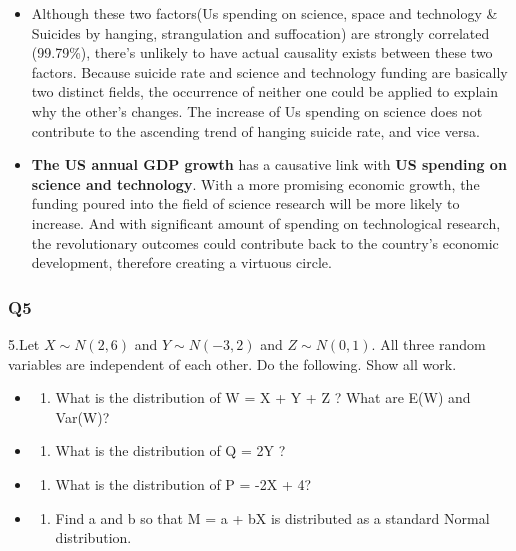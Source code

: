 \documentclass[11pt]{article}
\providecommand{\tightlist}{%
      \setlength{\itemsep}{0pt}\setlength{\parskip}{0pt}}
\begin{document}
\begin{itemize}
\item
  Although these two factors(Us spending on science, space and
  technology \& Suicides by hanging, strangulation and suffocation) are
  strongly correlated (99.79\%), there's unlikely to have actual
  causality exists between these two factors. Because suicide rate and
  science and technology funding are basically two distinct fields, the
  occurrence of neither one could be applied to explain why the other's
  changes. The increase of Us spending on science does not contribute to
  the ascending trend of hanging suicide rate, and vice versa.
\item
  \textbf{The US annual GDP growth} has a causative link with \textbf{US
  spending on science and technology}. With a more promising economic
  growth, the funding poured into the field of science research will be
  more likely to increase. And with significant amount of spending on
  technological research, the revolutionary outcomes could contribute
  back to the country's economic development, therefore creating a
  virtuous circle.
\end{itemize}

    \subsubsection*{Q5}\label{q5}

    5.Let \(X \sim N(2, 6)\) and \(Y \sim N(-3, 2)\) and \(Z \sim N(0, 1)\).
All three random variables are independent of each other. Do the
following. Show all work.

\begin{itemize}
\item
  \begin{enumerate}
  \def\labelenumi{(\alph{enumi})}
  \tightlist
  \item
    What is the distribution of W = X + Y + Z ? What are E(W) and
    Var(W)?
  \end{enumerate}
\item
  \begin{enumerate}
  \def\labelenumi{(\alph{enumi})}
  \setcounter{enumi}{1}
  \tightlist
  \item
    What is the distribution of Q = 2Y ?
  \end{enumerate}
\item
  \begin{enumerate}
  \def\labelenumi{(\alph{enumi})}
  \setcounter{enumi}{2}
  \tightlist
  \item
    What is the distribution of P = -2X + 4?
  \end{enumerate}
\item
  \begin{enumerate}
  \def\labelenumi{(\alph{enumi})}
  \setcounter{enumi}{3}
  \tightlist
  \item
    Find a and b so that M = a + bX is distributed as a standard Normal
    distribution.
  \end{enumerate}
\end{itemize}
\end{document}
